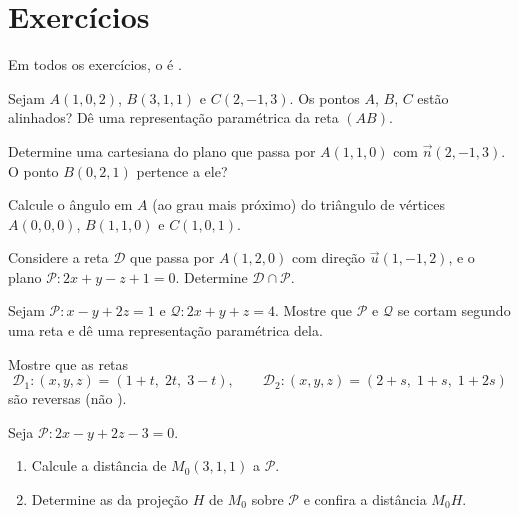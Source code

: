 \section{Exercícios}

Em todos os exercícios, o  é .

\begin{exercise}[$\star$]\label{exo:g12:space:1}
Sejam $A(1, 0, 2)$, $B(3, 1, 1)$ e $C(2, -1, 3)$. Os pontos $A$, $B$, $C$
estão alinhados? Dê uma representação paramétrica da reta $(AB)$.
\end{exercise}

\begin{exercise}[$\star$]\label{exo:g12:space:2}
Determine uma  cartesiana do plano que passa por $A(1, 1, 0)$ com
 $\vec n(2, -1, 3)$. O ponto $B(0, 2, 1)$ pertence a ele?
\end{exercise}

\begin{exercise}[$\star$]\label{exo:g12:space:3}
Calcule o ângulo em $A$ (ao grau mais próximo) do triângulo de vértices
$A(0,0,0)$, $B(1, 1, 0)$ e $C(1, 0, 1)$.
\end{exercise}

\begin{exercise}[$\star\star$]\label{exo:g12:space:4}
Considere a reta $\mathcal D$ que passa por $A(1, 2, 0)$ com direção
$\vec u(1, -1, 2)$, e o plano $\mathcal P : 2x + y - z + 1 = 0$.
Determine $\mathcal D \cap \mathcal P$.
\end{exercise}

\begin{exercise}[$\star\star$]\label{exo:g12:space:5}
Sejam $\mathcal P : x - y + 2z = 1$ e $\mathcal Q : 2x + y + z = 4$.
Mostre que $\mathcal P$ e $\mathcal Q$ se cortam segundo uma reta e dê uma
representação paramétrica dela.
\end{exercise}

\begin{exercise}[$\star\star$]\label{exo:g12:space:6}
Mostre que as retas
\[
\mathcal D_1 : (x, y, z) = (1 + t,\; 2t,\; 3 - t), \qquad
\mathcal D_2 : (x, y, z) = (2 + s,\; 1 + s,\; 1 + 2s)
\]
são reversas (não ).
\end{exercise}

\begin{exercise}[$\star\star$]\label{exo:g12:space:7}
Seja $\mathcal P : 2x - y + 2z - 3 = 0$.
\begin{enumerate}
  \item Calcule a distância de $M_0(3, 1, 1)$ a $\mathcal P$.
  \item Determine as  da projeção  $H$ de $M_0$ sobre
        $\mathcal P$ e confira a distância $M_0H$.
\end{enumerate}
\end{exercise}

